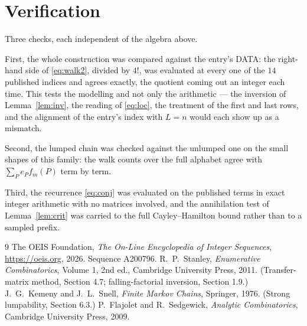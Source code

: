 \documentclass[11pt,a4paper]{article}
\theoremstyle{plain}
\theoremstyle{definition}
\begin{document}
\section{Verification}

Three checks, each independent of the algebra above.

First, the whole construction was compared against the entry's DATA: the right-hand side of
\eqref{eq:walk2}, divided by $4!$, was evaluated at every one of the $14$
published indices and agrees exactly, the quotient coming out an integer each time. This
tests the modelling and not only the arithmetic --- the inversion of Lemma~\ref{lem:inv},
the reading of \eqref{eq:loc}, the treatment of the first and last rows, and the
alignment of the entry's index with $L=n$ would each show up as a mismatch.

Second, the lumped chain was checked against the unlumped one on the small shapes of this
family: the walk counts over the full alphabet agree with $\sum_P e_Pf_m(P)$ term by term.

Third, the recurrence \eqref{eq:conj} was evaluated on the published terms in exact integer
arithmetic with no matrices involved, and the annihilation test of Lemma~\ref{lem:crit} was
carried to the full Cayley--Hamilton bound rather than to a sampled prefix.

\begin{thebibliography}{9}
 The OEIS Foundation, \emph{The On-Line Encyclopedia of Integer
Sequences}, \url{https://oeis.org}, 2026. Sequence A200796.
 R.~P.~Stanley, \emph{Enumerative Combinatorics}, Volume 1, 2nd ed.,
Cambridge University Press, 2011. (Transfer-matrix method, Section 4.7; falling-factorial
inversion, Section 1.9.)
 J.~G.~Kemeny and J.~L.~Snell, \emph{Finite Markov Chains}, Springer,
1976. (Strong lumpability, Section 6.3.)
 P.~Flajolet and R.~Sedgewick, \emph{Analytic Combinatorics}, Cambridge
University Press, 2009.
\end{thebibliography}
\end{document}
